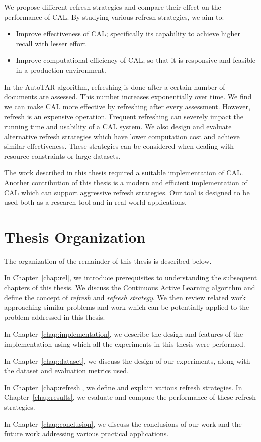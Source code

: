 We propose different refresh strategies and compare their effect on the
performance of CAL. By studying various refresh strategies, we aim to:
\begin{itemize} \item Improve effectiveness of CAL; specifically its capability
to achieve higher recall with lesser effort \item Improve computational
efficiency of CAL; so that it is responsive and  feasible in a production
environment.  \end{itemize}

In the AutoTAR algorithm, refreshing is done after a certain number of documents
are assessed. This number increases exponentially over time. We find we can make CAL
more effective by refreshing after every assessment. However, refresh is an
expensive operation. Frequent refreshing can severely impact the running time
and usability of a CAL system. We also design and evaluate
alternative refresh strategies which have lower computation cost and achieve similar
effectiveness.  These strategies can be considered when dealing with resource
constraints or large datasets.

The work described in this thesis required a suitable implementation of CAL.
Another contribution of this thesis is a modern and efficient implementation of
CAL which can support aggressive refresh strategies. Our tool is designed to be
used both as a research tool and in real world applications.  


\section{Thesis Organization}

The organization of the remainder of this thesis is described below.

In Chapter~\ref{chap:rel}, we introduce prerequisites to understanding the
subsequent chapters of this thesis. We discuss the Continuous Active Learning
algorithm and define the concept of \textit{refresh} and \textit{refresh
strategy}. We then review related work approaching similar problems and work
which can be potentially applied to the problem addressed in this thesis.

In Chapter~\ref{chap:implementation}, we describe the design and features of
the implementation using which all the experiments in this thesis were
performed.

In Chapter~\ref{chap:dataset}, we discuss the design of our experiments, along
with the dataset and evaluation metrics used.

In Chapter~\ref{chap:refresh}, we define and explain various refresh strategies.  In
Chapter~\ref{chap:results}, we evaluate and compare the performance of these
refresh strategies.

In Chapter~\ref{chap:conclusion}, we discuss the conclusions of our work
and the future work addressing various practical applications.

